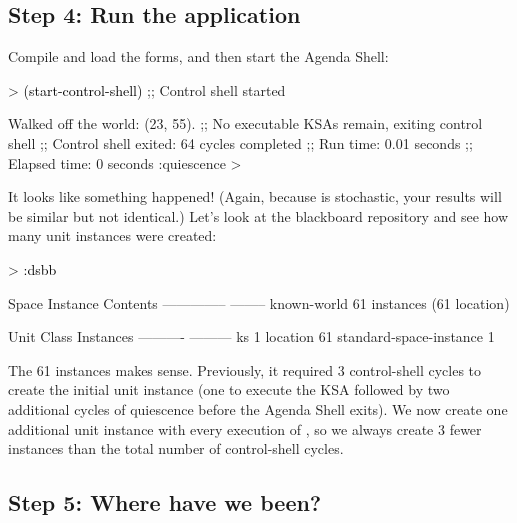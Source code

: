 \documentclass[10pt,twoside,english,pdftex]{article}
\begin{document}
\subsection*{Step 4:  Run the application}

%
Compile and load the  forms, and then start the Agenda Shell:
%
\begin{example}\color{darkergray}%
  > \textcolor{black}{(start-control-shell)}
  ;; Control shell started

  Walked off the world: (23, 55).
  ;; No executable KSAs remain, exiting control shell
  ;; Control shell exited: 64 cycles completed
  ;; Run time: 0.01 seconds
  ;; Elapsed time: 0 seconds
  :quiescence
  >
\end{example}

%
It looks like something happened! (Again, because 
is stochastic, your results will be similar but not identical.)  Let's look at
the blackboard repository and see how many  unit instances were
created:
%
\begin{example}\color{darkergray}%
  > \textcolor{black}{:dsbb}

  Space Instance                Contents
  --------------                --------
  known-world                   61 instances (61 location)

  Unit Class                    Instances
  ----------                    ---------
  ks                                    1
  location                             61
  standard-space-instance               1
\end{example}

The 61  instances makes sense.  Previously, it required 3
control-shell cycles to create the initial  unit instance (one
to execute the  KSA followed by two additional cycles of
quiescence before the Agenda Shell exits).  We now create one additional
 unit instance with every execution of ,
so we always create 3 fewer  instances than the total
number of control-shell cycles.

\subsection*{Step 5:  Where have we been?}
\end{document}
